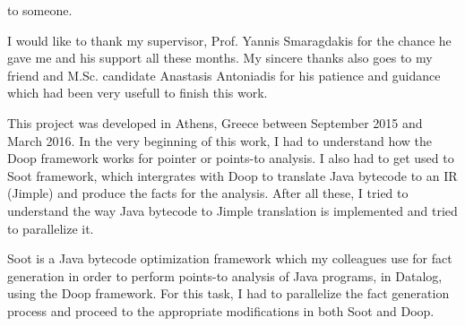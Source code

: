 \documentclass{dithesis}
\begin{document}
\begin{thesisdedication}
to someone.
\end{thesisdedication}

\begin{thesisacknowledgments}[ACKNOWLEDGEMENTS]
    I would like to thank my supervisor, Prof. Yannis Smaragdakis for the chance he gave me and his support all these months.
    My sincere thanks also goes to my friend and M.Sc. candidate Anastasis Antoniadis for his patience and guidance which had been very usefull to finish this work.
\end{thesisacknowledgments}

\renewcommand*\contentsname{Contents}
\renewcommand*\listfigurename{List of Figures}
\renewcommand*\listtablename{List of Tables}
\renewcommand{\figurename}{Figure}
\renewcommand{\tablename}{Table}

\tableofcontents
\listoffigures
\listoftables



\begin{thesisprologue}[PREFACE]
    This project was developed in Athens, Greece between September 2015 and March 2016. In the very beginning of this work, I had to understand how the Doop framework works for pointer or points-to analysis. I also had to get used to Soot framework, which intergrates with Doop to translate Java bytecode to an IR (Jimple) and produce the facts for the analysis. After all these, I tried to understand the way Java bytecode to Jimple translation is implemented and tried to parallelize it. 
\end{thesisprologue}

    Soot is a Java bytecode optimization framework which my colleagues use for fact generation in order to perform points-to analysis of Java programs, in Datalog, using the Doop framework. For this task, I had to parallelize the fact generation process and proceed to the appropriate modifications in both Soot and Doop. 
\end{document}
